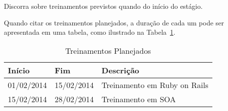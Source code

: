 Discorra sobre treinamentos previstos quando do início do estágio.

Quando citar os treinamentos planejados, a duração de cada um pode ser apresentada em uma tabela, como ilustrado na Tabela~\ref{tab:tab2}.

\begin{table}[!ht]
\begin{center}
\caption[Treinamentos Planejados]
{Treinamentos Planejados}\label{tab:tab2}

\begin{tabular}{llp{7cm}}
\hline

\hline
\textbf{Início}    & \textbf{Fim} &  \textbf{Descrição}                             \\
\hline
01/02/2014       & 15/02/2014                & Treinamento em Ruby on Rails \\
15/02/2014       & 28/02/2014                & Treinamento em SOA\\

\hline
\end{tabular}
\end{center}
\end{table}
